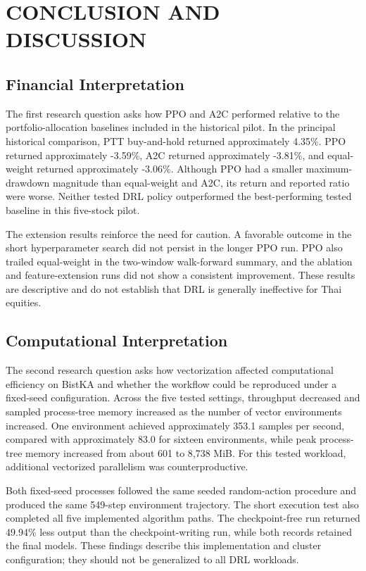 \documentclass[12pt,a4paper,oneside]{book}
\theoremstyle{plain}
\numberwithin{equation}{chapter} \DeclareMathOperator{\Var}{Var}
\begin{document}
\FloatBarrier
\chapter{CONCLUSION AND DISCUSSION}
\label{chap:discussion}
\section{Financial Interpretation}
The first research question asks how PPO and A2C performed relative to the portfolio-allocation baselines included in the historical pilot. In the principal historical comparison, PTT buy-and-hold returned approximately 4.35\%. PPO returned approximately -3.59\%, A2C returned approximately -3.81\%, and equal-weight returned approximately -3.06\%. Although PPO had a smaller maximum-drawdown magnitude than equal-weight and A2C, its return and reported ratio were worse. Neither tested DRL policy outperformed the best-performing tested baseline in this five-stock pilot.

The extension results reinforce the need for caution. A favorable outcome in the short hyperparameter search did not persist in the longer PPO run. PPO also trailed equal-weight in the two-window walk-forward summary, and the ablation and feature-extension runs did not show a consistent improvement. These results are descriptive and do not establish that DRL is generally ineffective for Thai equities.

\section{Computational Interpretation}
The second research question asks how vectorization affected computational efficiency on BistKA and whether the workflow could be reproduced under a fixed-seed configuration. Across the five tested settings, throughput decreased and sampled process-tree memory increased as the number of vector environments increased. One environment achieved approximately 353.1 samples per second, compared with approximately 83.0 for sixteen environments, while peak process-tree memory increased from about 601 to 8,738 MiB. For this tested workload, additional vectorized parallelism was counterproductive.

Both fixed-seed processes followed the same seeded random-action procedure and produced the same 549-step environment trajectory. The short execution test also completed all five implemented algorithm paths. The checkpoint-free run returned 49.94\% less output than the checkpoint-writing run, while both records retained the final models. These findings describe this implementation and cluster configuration; they should not be generalized to all DRL workloads.
\end{document}
